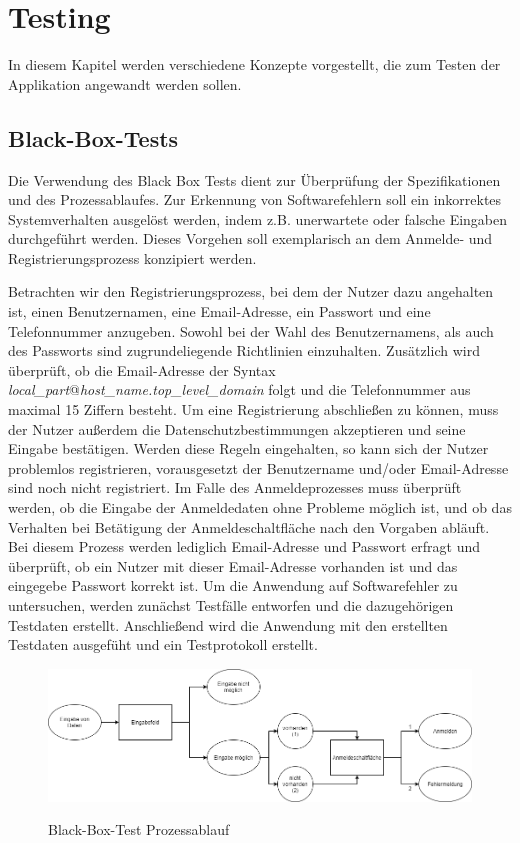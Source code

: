 
\chapter{Testing}
In diesem Kapitel werden verschiedene Konzepte vorgestellt, die zum Testen der Applikation angewandt werden sollen.

\section{Black-Box-Tests}
Die Verwendung des Black Box Tests dient zur Überprüfung der Spezifikationen und des Prozessablaufes.
Zur Erkennung von Softwarefehlern soll ein inkorrektes Systemverhalten ausgelöst werden, indem z.B. unerwartete oder falsche Eingaben durchgeführt werden.
Dieses Vorgehen soll exemplarisch an dem Anmelde- und Registrierungsprozess konzipiert werden.

Betrachten wir den Registrierungsprozess, bei dem der Nutzer dazu angehalten ist, einen Benutzernamen, eine Email-Adresse, ein Passwort und eine Telefonnummer anzugeben. 
Sowohl bei der Wahl des Benutzernamens, als auch des Passworts sind zugrundeliegende Richtlinien einzuhalten. Zusätzlich wird überprüft, ob die Email-Adresse der Syntax \emph{local\_part}@\emph{host\_name.top\_level\_domain} folgt und die Telefonnummer aus maximal 15 Ziffern besteht. Um eine Registrierung abschließen zu können, muss der Nutzer außerdem die Datenschutzbestimmungen akzeptieren und seine Eingabe bestätigen.
Werden diese Regeln eingehalten, so kann sich der Nutzer problemlos registrieren, vorausgesetzt der Benutzername und/oder Email-Adresse sind noch nicht registriert.
Im Falle des Anmeldeprozesses muss überprüft werden, ob die Eingabe der Anmeldedaten ohne Probleme möglich ist, und ob das Verhalten bei Betätigung der Anmeldeschaltfläche nach den Vorgaben abläuft.
Bei diesem Prozess werden lediglich Email-Adresse und Passwort erfragt und überprüft, ob ein Nutzer mit dieser Email-Adresse vorhanden ist und das eingegebe Passwort korrekt ist. 
Um die Anwendung auf Softwarefehler zu untersuchen, werden zunächst Testfälle entworfen und die dazugehörigen Testdaten erstellt. Anschließend wird die Anwendung mit den erstellten Testdaten ausgefüht und ein Testprotokoll erstellt. 

\begin{figure}
\centering
\includegraphics[width=\textwidth]{images/text/bbtest.png}
\label{fig:blackbox}
\caption{Black-Box-Test Prozessablauf}
\end{figure}


